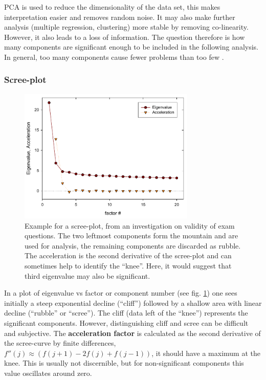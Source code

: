 \acs{PCA} is used to reduce the dimensionality of the data set, this makes interpretation easier and removes random noise. It may also make further analysis (multiple regression, clustering) more stable by removing co-linearity. However, it also leads to a loss of information. The question therefore is how many components are significant enough to be included in the following analysis. In general, too many components cause fewer problems than too few \parencite{Bas-12}.

\subsubsection{Scree-plot}\label{text:scree}

\begin{figure}
   \caption{Example for a scree-plot, from an investigation on validity of exam questions. The two leftmost components form the mountain and are used for analysis, the remaining components are discarded as rubble. The acceleration is the second derivative of the scree-plot and can sometimes help to identify the ``knee''. Here, it would suggest that third eigenvalue may also be significant.}
   \label{fig:Scree}
   \centering
      \includegraphics[width=0.75\textwidth]{Graphics/Acceleration}
\end{figure}

In a plot of eigenvalue vs factor or component number (see fig. \ref{fig:Scree}) \parencite{Cat-66} one sees initially a steep exponential decline (``cliff'') followed by a shallow area with linear decline (``rubble'' or ``scree''). The cliff (data left of the ``knee'') represents the significant components. However, distinguishing cliff and scree can be difficult and subjective. The \textbf{acceleration factor} is calculated as the second derivative of the scree-curve by finite differences, \(f''(j) \approx (f(j+1) - 2f(j) + f(j-1)) \), it should have a maximum at the knee. This is usually not discernible, but for non-significant components this value oscillates around zero.

